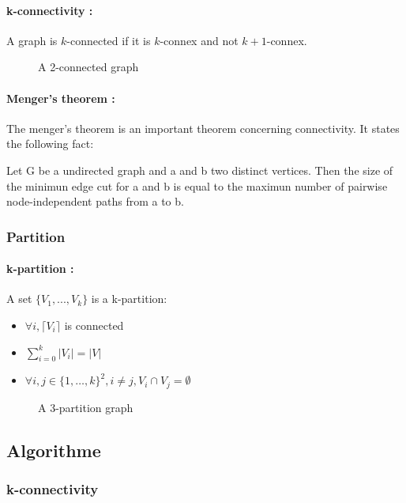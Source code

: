 \paragraph{k-connectivity :}
A graph is $k$-connected if it is $k$-connex and not $k+1$-connex. 

\begin{figure}[!h]
  \begin{center}
    
  \end{center}
  \caption{A 2-connected graph}
\end{figure}

\paragraph{Menger's theorem :}
The menger's theorem is an important theorem concerning connectivity.
It states the following fact:

Let G be a undirected graph and a and b two distinct vertices.
Then the size of the minimun edge cut for a and b is equal to the maximun number of pairwise node-independent paths from a to b.


\subsubsection{Partition}
\paragraph{k-partition :}
A set $\{V_1,...,V_k\}$ is a k-partition:
\begin{itemize}
    \item $\forall i, \lceil V_i \rceil$ is connected
    \item $\sum\limits_{i=0}^k|V_i| = |V|$
    \item $\forall i,j \in \{1, \dots, k\}^2, i \neq j, V_i \cap V_j = \emptyset$
\end{itemize}

\begin{figure}[!h]
    \begin{center}
        
    \end{center}
    \caption{A 3-partition graph}
\end{figure}

\subsection{Algorithme}
\subsubsection{k-connectivity}
